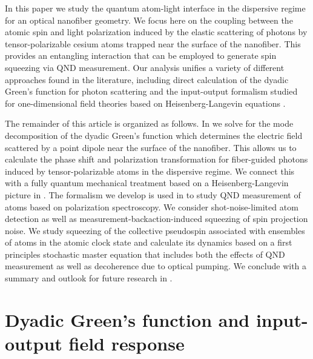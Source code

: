 \documentclass[preprint, aps,pra,onecolumn]{revtex4-1} %
\begin{document}
In this paper we study the quantum atom-light interface in the dispersive regime for an optical nanofiber geometry.  We focus here on the coupling between the atomic spin and light polarization induced by the elastic scattering of photons by tensor-polarizable cesium atoms trapped near the surface of the nanofiber.  This provides an entangling interaction that can be employed to generate spin squeezing via QND measurement.  Our analysis unifies a variety of different approaches found in the literature, including direct calculation of the dyadic Green's function for photon scattering \cite{sakoda_optical_1996, dung_spontaneous_2000, sondergaard_general_2001, klimov_spontaneous_2004, wubs_multiple-scattering_2004, fussell_decay_2005, manga_rao_single_2007, dzsotjan_quantum_2010} and the input-output formalism studied for one-dimensional field theories based on Heisenberg-Langevin equations \cite{gardiner_input_1985, blow_continuum_1990, shen_coherent_2005, le_kien_spontaneous_2005, le_kien_correlations_2008, fan_input-output_2010}.

The remainder of this article is organized as follows.  
In  we solve for the mode decomposition of the dyadic Green's function which determines the electric field scattered by a point dipole near the surface of the nanofiber.  
This allows us to calculate the phase shift and polarization transformation for fiber-guided photons induced by tensor-polarizable atoms in the dispersive regime.  
We connect this with a fully quantum mechanical treatment based on a Heisenberg-Langevin picture in .  
The formalism we develop is used in  to study QND measurement of atoms based on polarization spectroscopy. 
We consider shot-noise-limited atom detection as well as measurement-backaction-induced squeezing of spin projection noise.  
We study squeezing of the collective pseudospin associated with ensembles of atoms in the atomic clock state and calculate its dynamics based on a first principles stochastic master equation that includes both the effects of QND measurement as well as decoherence due to optical pumping.  
We conclude with a summary and outlook for future research in .  


\section{Dyadic Green's function and input-output field response} \label{Sec::GreensFunction}
\end{document}
